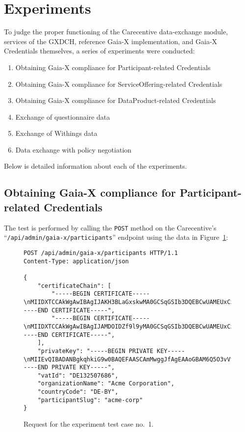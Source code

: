 \section{Experiments}\label{sec:experiments}

To judge the proper functioning of the Carecentive data-exchange module, services of the GXDCH, reference Gaia-X implementation, and Gaia-X Credentials themselves, a series of experiments were conducted:
\begin{enumerate}
    \item Obtaining Gaia-X compliance for Participant-related Credentials
    \item Obtaining Gaia-X compliance for ServiceOffering-related Credentials
    \item Obtaining Gaia-X compliance for DataProduct-related Credentials
    \item Exchange of questionnaire data
    \item Exchange of Withings data
    \item Data exchange with policy negotiation
\end{enumerate}

Below is detailed information about each of the experiments.

\subsection[Participant Compliance]{Obtaining Gaia-X compliance for Participant-related Credentials}\label{subsec:participant-compliance}

The test is performed by calling the \texttt{POST} method on the Carecentive's ``\texttt{/api/admin/gaia-x/participants}'' endpoint using the data in Figure~\ref{fig:test_case_1}:

\begin{figure}[h]
    \centering
    \begin{verbatim}
POST /api/admin/gaia-x/participants HTTP/1.1
Content-Type: application/json

{
	"certificateChain": [
		"-----BEGIN CERTIFICATE-----\nMIIDXTCCAkWgAwIBAgIJAKH3BLaGxskwMA0GCSqGSIb3DQEBCwUAMEUxCzAJBgNV\n...\nJmCVzwB/MCuv3z4IV0IsbP5ZKh+6m0oI+RINdDl4Stxdj6LK8JspNeU0R6mBg1A=\n-----END CERTIFICATE-----",
		"-----BEGIN CERTIFICATE-----\nMIIDXTCCAkWgAwIBAgIJAMDOIDZf9l9yMA0GCSqGSIb3DQEBCwUAMEUxCzAJBgNV\n...\nv5pXVIlZm8DtRmDTUp8pNDnQ5UAZTuDPaWo3zbxZPOUmGJ1IlBOgaQvsyPCW5gU=\n-----END CERTIFICATE-----",
	],
	"privateKey": "-----BEGIN PRIVATE KEY-----\nMIIEvQIBADANBgkqhkiG9w0BAQEFAASCAmMwggJfAgEAAoGBAM6Q5O3vVfnxk6P7\n...\nYWw+HiFJh9XQpRUtv9PV8L8AqFFfMdsOpT6pgC+aA/WB\n-----END PRIVATE KEY-----",
	"vatId": "DE132507686",
	"organizationName": "Acme Corporation",
	"countryCode": "DE-BY",
	"participantSlug": "acme-corp"
}
    \end{verbatim}
    \caption{Request for the experiment test case no.~1.}\label{fig:test_case_1}
\end{figure}

